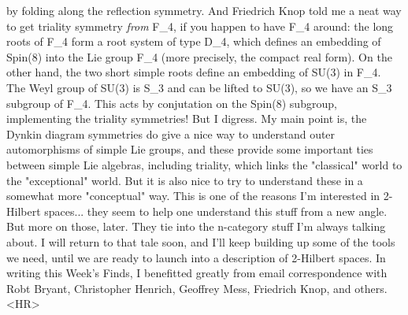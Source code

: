 by folding along the reflection symmetry.  And Friedrich Knop
told me a neat way to get triality symmetry \emph{from} F_4, if you
happen to have F_4 around: the long roots of F_4 form a root system
of type D_4, which defines an embedding of Spin(8) into the Lie
group F_4 (more precisely, the compact real form).  On the other
hand, the two short simple roots define an embedding of SU(3)
in F_4.  The Weyl group of SU(3) is S_3 and can be lifted to
SU(3), so we have an S_3 subgroup of F_4.  This acts by conjutation
on the Spin(8) subgroup, implementing the triality symmetries!
But I digress.  My main point is, the Dynkin diagram symmetries
do give a nice way to understand outer automorphisms of simple
Lie groups, and these provide some important ties between simple
Lie algebras, including triality, which links the "classical" 
world to the "exceptional" world.  But it is also nice to try
to understand these in a somewhat more "conceptual" way.  This is one of the
reasons I'm interested in 2-Hilbert spaces... they seem to help
one understand this stuff from a new angle.  But more on those,
later.  They tie into the n-category stuff I'm always talking
about.  I will return to that tale soon, and I'll keep building
up some of the tools we need, until we are ready to launch
into a description of 2-Hilbert spaces. 
In writing this Week's Finds, I benefitted greatly from email
correspondence with Robt Bryant, Christopher Henrich, 
Geoffrey Mess, Friedrich Knop, and others.
<HR>



